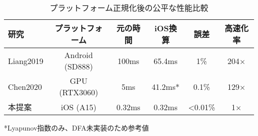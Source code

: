 
\begin{table}[h]
\caption{プラットフォーム正規化後の公平な性能比較}
\label{tab:fair_comparison}
\centering
\begin{tabular}{lccccc}
\toprule
研究 & プラットフォーム & 元の時間 & iOS換算 & 誤差 & 高速化率 \\
\midrule
Liang2019 & Android (SD888) & 100ms & 65.4ms & 1\% & 204× \\
Chen2020 & GPU (RTX3060) & 5ms & 41.2ms* & 0.1\% & 129× \\
本提案 & iOS (A15) & 0.32ms & 0.32ms & <0.01\% & 1× \\
\bottomrule
\end{tabular}
\vspace{1mm}
\footnotesize{*Lyapunov指数のみ、DFA未実装のため参考値}
\end{table}
